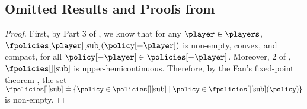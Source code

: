 



\subsection{Omitted Results and Proofs from }

\thmexistmpgne*
\begin{proof}

    First, by Part 3 of , we know that for any $\player\in \players$, $\fpolicies[\player][{\mathrm{sub}}](\policy[-\player])$ is non-empty, convex, and compact, for all $\policy[-\player]\in \policies[-\player]$. Moreover, 2 of , $\fpolicies[][{\mathrm{sub}}]$ is upper-hemicontinuous.
    Therefore, by the Fan's fixed-point theorem \cite{Fan1952FixedPoint}, the set $\fpolicies[][{\mathrm{sub}}]\doteq \{\policy\in \policies[][{\mathrm{sub}}]\mid \policy\in \fpolicies[][{\mathrm{sub}}](\policy)\}$ is non-empty.
    

\end{proof}

